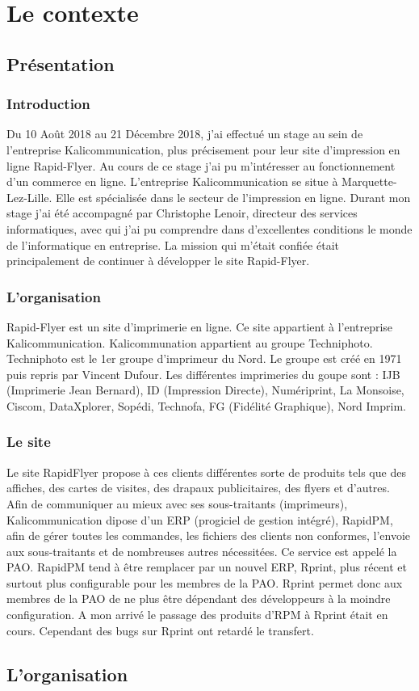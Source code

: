 \documentclass[a4paper]{report}
\begin{document}
\part{Le contexte}
\chapter{Présentation}
\section{Introduction}
Du 10 Août 2018 au 21 Décembre 2018, j'ai effectué un stage au sein de l'entreprise Kalicommunication, plus précisement pour leur site d'impression en ligne Rapid-Flyer. Au cours de ce stage j'ai pu m'intéresser au fonctionnement d'un commerce en ligne.\newline
L'entreprise Kalicommunication se situe à Marquette-Lez-Lille. Elle est spécialisée dans le secteur de l'impression en ligne.\newline
Durant mon stage j'ai été accompagné par Christophe Lenoir, directeur des services informatiques, avec qui j'ai pu comprendre dans d'excellentes conditions le monde de l'informatique en entreprise. La mission qui m'était confiée était principalement de continuer à développer le site Rapid-Flyer.
\section{L'organisation}
Rapid-Flyer est un site d’imprimerie en ligne. Ce site appartient à l’entreprise Kalicommunication. Kalicommunation appartient au groupe Techniphoto. 
Techniphoto est le 1er groupe d'imprimeur du Nord. 
Le groupe est créé en 1971 puis repris par Vincent Dufour. Les différentes imprimeries du goupe sont : IJB (Imprimerie Jean Bernard), ID (Impression Directe), Numériprint, La Monsoise, Ciscom, DataXplorer, Sopédi, Technofa, FG (Fidélité Graphique), Nord Imprim. 

\section{Le site}
Le site RapidFlyer propose à ces clients différentes sorte de produits tels que des affiches, des cartes de visites, des drapaux publicitaires, des flyers et d’autres. 
Afin de communiquer au mieux avec ses sous-traitants (imprimeurs), Kalicommunication dipose d’un ERP (progiciel de gestion intégré), RapidPM, afin de gérer toutes les commandes, les fichiers des clients non conformes, l’envoie aux sous-traitants et de nombreuses autres nécessitées. Ce service est appelé la PAO. RapidPM tend à être remplacer par un nouvel ERP, Rprint, plus récent et surtout plus configurable pour les membres de la PAO. Rprint permet donc aux membres de la PAO de ne plus être dépendant des développeurs à la moindre configuration. A mon arrivé le passage des produits d’RPM à Rprint était en cours. Cependant des bugs sur Rprint ont retardé le transfert. %

\chapter{L'organisation}
\end{document}
